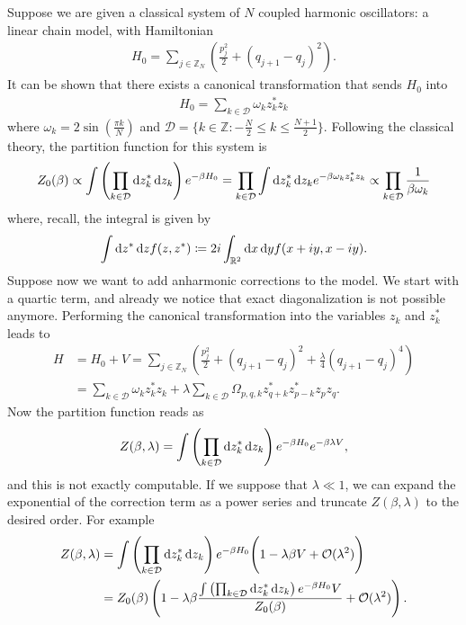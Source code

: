 Suppose we are given a classical system of $N$ coupled harmonic oscillators: a linear chain
model, with Hamiltonian
\begin{align*}
	H_0 = \sum_{j\in\mathbb{Z}_N} \left( \frac{p_j^2}{2} + (q_{j+1} - q_j)^2 \right).
\end{align*}
It can be shown that there exists a canonical transformation that sends $H_0$ into
\begin{align*}
	H_0 = \sum_{k\in\mathcal{D}} \omega_k z_k^* z_k
\end{align*}
where $\omega_k = 2\sin(\frac{\pi k}{N})$ and $\mathcal{D}=\{k\in\mathbb{Z}:-\frac{N}{2}\leq k\leq \frac{N+1}{2}\}$.
Following the classical theory, the partition function for this system is
\begin{align*}
	Z_0(\beta) \propto \int \left(\prod_{k\in\mathcal{D}}\mathrm{d} z^*_k\,\mathrm{d} z_k\right) e^{-\beta H_0}
	= \prod_{k\in\mathcal{D}} \int\mathrm{d} z^*_k\,\mathrm{d} z_k e^{-\beta\omega_k z^*_k z_k}
	\propto \prod_{k\in\mathcal{D}} \frac{1}{\beta\omega_k}
\end{align*}
where, recall, the integral is given by
\begin{align*}
	\int\mathrm{d} z^*\,\mathrm{d} z f(z,z^*) \coloneq 2i\int_{\mathbb{R}^2} \mathrm{d} x\,\mathrm{d} y f(x+iy,x-iy).
\end{align*}
Suppose now we want to add anharmonic corrections to the model. We start with a quartic term,
and already we notice that exact diagonalization is not possible anymore. Performing the
canonical transformation into the variables $z_k$ and $z_k^*$ leads to
\begin{align*}
	H
	&= H_0 + V = \sum_{j\in\mathbb{Z}_N}\left( \frac{p_j^2}{2} + (q_{j+1}-q_j)^2 + \frac{\lambda}{4}(q_{j+1}-q_j)^4 \right)\\
	&= \sum_{k\in\mathcal{D}}\omega_k z^*_k z_k
	+ \lambda\sum_{k\in\mathcal{D}}\Omega_{p,q,k} z^*_{q+k} z^*_{p-k} z_p z_q.
\end{align*}
Now the partition function reads as
\begin{align}
	\label{eq:partition-function-correction}
	Z(\beta,\lambda) = \int\left(\prod_{k\in\mathcal{D}}\mathrm{d} z^*_k\,\mathrm{d} z_k\right)e^{-\beta H_0}e^{-\beta\lambda V},
\end{align}
and this is not exactly computable. If we suppose that $\lambda\ll1$, we can expand the
exponential of the correction term as a power series and truncate $Z(\beta,\lambda)$ to the
desired order. For example
\begin{align*}
	Z(\beta,\lambda)
	&= \int\left(\prod_{k\in\mathcal{D}}\mathrm{d} z^*_k\,\mathrm{d} z_k\right)e^{-\beta H_0}
	\Bigg(1 - \lambda\beta V + \mathcal{O}(\lambda^2)\Bigg)\\
	&= Z_0(\beta)\left(1 - \lambda\beta
		\frac{\int\left(\prod_{k\in\mathcal{D}}\mathrm{d} z^*_k\,\mathrm{d} z_k\right)e^{-\beta H_0}V}{Z_0(\beta)}
		+ \mathcal{O}(\lambda^2)
	\right).
\end{align*}
